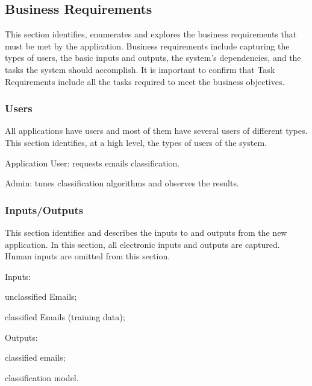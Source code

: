 \newpage
\subsection{Business Requirements}

This section identifies, enumerates and explores the business requirements that must 
be met by the application. Business requirements include capturing the types of users, 
the basic inputs and outputs, the system's dependencies, and the tasks the system should 
accomplish. It is important to confirm that Task Requirements include all the tasks 
required to meet the business objectives.

\subsubsection{Users}
All applications have users and most of them have several users of different types. This 
section identifies, at a high level, the types of users of the system.

\begin{my_enumerate}
  \item Application User: requests emails classification.
  \item Admin: tunes classification algorithms and observes the results.
\end{my_enumerate}

\subsubsection{Inputs/Outputs}
This section identifies and describes the inputs to and outputs from the new 
application. In this section, all electronic inputs and outputs 
are captured. Human inputs are omitted from this section.

\begin{my_enumerate}
  \item Inputs:
  \begin{my_itemize}
    \item unclassified Emails;
    \item classified Emails (training data);
  \end{my_itemize}
  \item Outputs:
  \begin{my_itemize}
    \item classified emails;
    \item classification model.
  \end{my_itemize}
\end{my_enumerate}


